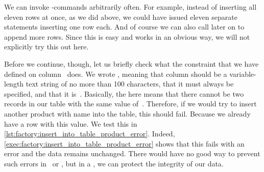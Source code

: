We can invoke -commands arbitrarily often.
For example, instead of inserting all eleven rows at once, as we did above, we could have issued eleven separate  statements inserting one row each.
And of course we can also call  later on to append more rows.
Since this is easy and works in an obvious way, we will not explicitly try this out here.

Before we continue, though, let us briefly check what the  constraint that we have defined on column~ does.
We wrote , meaning that column  should be a variable-length text string of no more than 100 characters, that it must always be specified, and that it is~.
Basically, the  here means that there cannot be two records in our table with the same value of~.
Therefore, if we would try to insert another product with name  into the table, this should fail.
Because we already have a row with this value.
We test this in \cref{lst:factory:insert_into_table_product_error}.
Indeed, \cref{exec:factory:insert_into_table_product_error} shows that this fails with an error and the data remains unchanged.
There would have no good way to prevent such errors in \microsoftExcel\ or \libreofficeCalc, but in a \dbms, we can protect the integrity of our data.%
%
\FloatBarrier%
\endhsection%
%
